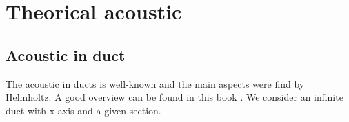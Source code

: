 \section{Theorical acoustic}\label{sec:section2}
\subsection{Acoustic in duct}
The acoustic in ducts is well-known and the main aspects were find by Helmholtz. A good overview can be found in this book \cite{Luck_thesis}.
We consider an infinite duct with x axis and a given section.


